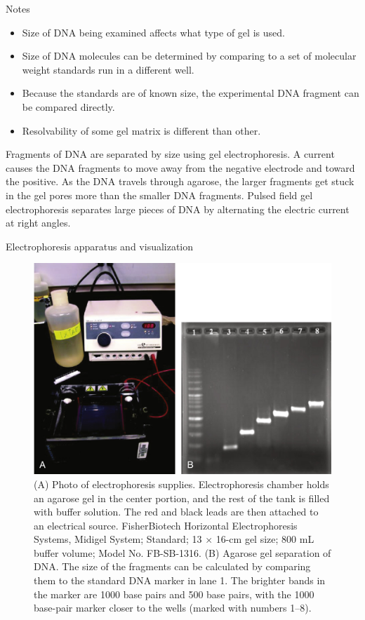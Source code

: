 \documentclass[ignorenonframetext,aspectratio=169]{beamer}
\providecommand{\tightlist}{%
  \setlength{\itemsep}{0pt}\setlength{\parskip}{0pt}}
\begin{document}
\begin{frame}{Notes}
\protect\hypertarget{notes}{}

\begin{itemize}
\tightlist
\item
  Size of DNA being examined affects what type of gel is used.
\item
  Size of DNA molecules can be determined by comparing to a set of
  molecular weight standards run in a different well.
\item
  Because the standards are of known size, the experimental DNA fragment
  can be compared directly.
\item
  Resolvability of some gel matrix is different than other.
\end{itemize}

\begin{block}{}
\textrm{Fragments of DNA are separated by size using gel electrophoresis. A current causes the DNA fragments to move away from the negative electrode and toward the positive. As the DNA travels through agarose, the larger fragments get stuck in the gel pores more than the smaller DNA fragments. Pulsed field gel electrophoresis separates large pieces of DNA by alternating the electric current at right angles.}
\end{block}

\end{frame}

\begin{frame}{Electrophoresis apparatus and visualization}
\protect\hypertarget{electrophoresis-apparatus-and-visualization}{}

\begin{figure}
\includegraphics[width=0.45\linewidth]{./../images/electrophoresis} \caption{(A) Photo of electrophoresis supplies. Electrophoresis chamber holds an agarose gel in the center portion, and the rest of the tank is filled with buffer solution. The red and black leads are then attached to an electrical source. FisherBiotech Horizontal Electrophoresis Systems, Midigel System; Standard; 13 $\times$ 16-cm gel size; 800 mL buffer volume; Model No. FB-SB-1316. (B) Agarose gel separation of DNA. The size of the fragments can be calculated by comparing them to the standard DNA marker in lane 1. The brighter bands in the marker are 1000 base pairs and 500 base pairs, with the 1000 base-pair marker closer to the wells (marked with numbers 1–8).}\label{fig:gel-electrophoresis}
\end{figure}

\end{frame}
\end{document}
